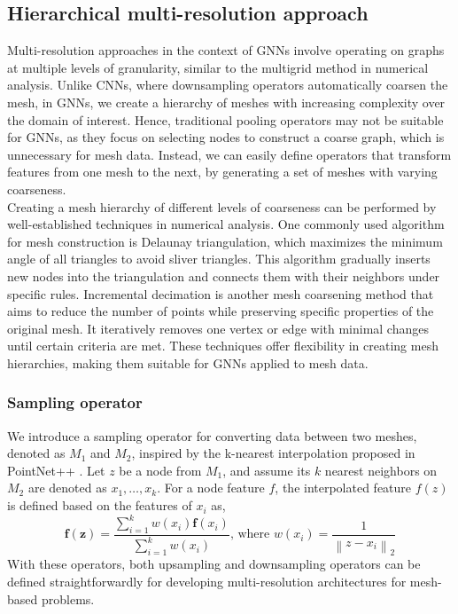 \subsection{Hierarchical multi-resolution approach} 
\label{SO}
Multi-resolution approaches in the context of GNNs involve operating on graphs at multiple levels of granularity, similar to the multigrid method in numerical analysis. 
Unlike CNNs, where downsampling operators automatically coarsen the mesh, in GNNs, we create a hierarchy of meshes with increasing complexity over the domain of interest. Hence, traditional pooling operators may not be suitable for GNNs, as they focus on selecting nodes to construct a coarse graph, which is unnecessary for mesh data. Instead, we can easily define operators that transform features from one mesh to the next, by generating a set of meshes with varying coarseness.\\
Creating a mesh hierarchy of different levels of coarseness can be performed by well-established techniques in numerical analysis. One commonly used algorithm for mesh construction is Delaunay triangulation, which maximizes the minimum angle of all triangles to avoid sliver triangles. This algorithm gradually inserts new nodes into the triangulation and connects them with their neighbors under specific rules. Incremental decimation is another mesh coarsening method that aims to reduce the number of points while preserving specific properties of the original mesh. It iteratively removes one vertex or edge with minimal changes until certain criteria are met. These techniques offer flexibility in creating mesh hierarchies, making them suitable for GNNs applied to mesh data.\\
\subsubsection{Sampling operator}
We introduce a sampling operator for converting data between two meshes, denoted as \(M_1\) and \(M_2\), inspired by the k-nearest interpolation proposed in PointNet++ \cite{pnpp}. Let \(z\) be a node from \(M_1\), and assume its \(k\) nearest neighbors on \(M_2\) are denoted as \(x_1, \ldots, x_k\). For a node feature \(f\), the interpolated feature \(f(z)\) is defined based on the features of \(x_i\) as,
\begin{equation}
  \mathbf{f}(\mathbf{z})=\frac{\sum_{i=1}^k w\left(x_i\right) \mathbf{f}\left(x_i\right)}{\sum_{i=1}^k w\left(x_i\right)} \text {, where } w\left(x_i\right)=\frac{1}{\left\|z-x_i\right\|_2}
  \end{equation}
With these operators, both upsampling and downsampling operators can be defined straightforwardly for developing multi-resolution architectures for mesh-based problems.
